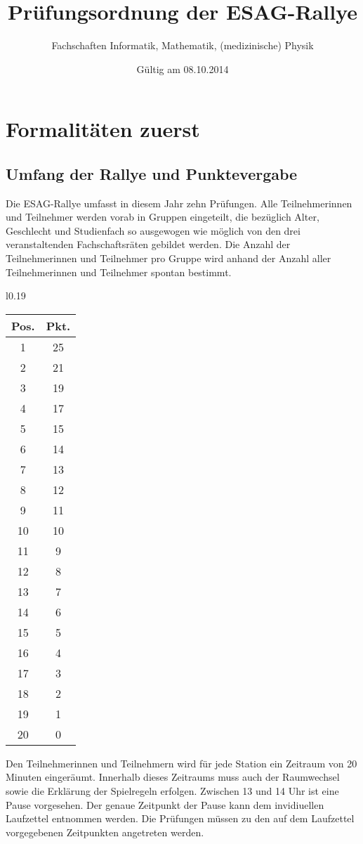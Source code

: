 \documentclass[a4paper,10pt]{article}
\title{Prüfungsordnung der ESAG-Rallye}
\author{Fachschaften Informatik, Mathematik, (medizinische) Physik}
\date{Gültig am 08.10.2014}
\begin{document}
\pagestyle{plain}
\maketitle
\tableofcontents

\newpage
\pagestyle{plain}
\section[Formalitäten]{Formalitäten zuerst}

\subsection{Umfang der Rallye und Punktevergabe}

Die ESAG-Rallye umfasst in diesem Jahr zehn Prüfungen. Alle Teilnehmerinnen 
und Teilnehmer werden vorab in Gruppen eingeteilt, die bezüglich Alter, Geschlecht und
Studienfach so ausgewogen wie möglich von den drei veranstaltenden
Fachschaftsräten gebildet werden. Die Anzahl der Teilnehmerinnen und Teilnehmer pro Gruppe
wird anhand der Anzahl aller Teilnehmerinnen und Teilnehmer spontan bestimmt.

\begin{wrapfigure}{l}{0.19\textwidth}
\begin{tabular}{c|c}
\textbf{Pos.} & \textbf{Pkt.} \\
\hline
1 & 25\\
2 & 21 \\
3 & 19 \\
4 & 17 \\
5 & 15 \\
6 & 14 \\
7 & 13 \\
8 & 12 \\
9 & 11 \\
10 &10 \\
11 & 9 \\
12 & 8 \\
13 & 7 \\
14 & 6 \\
15 & 5\\
16 & 4\\
17 & 3\\
18 & 2\\
19 & 1\\
20 & 0
\end{tabular}
\vspace{15pt}
\end{wrapfigure}

Den Teilnehmerinnen und Teilnehmern wird für jede Station ein Zeitraum 
von 20 Minuten eingeräumt. Innerhalb dieses Zeitraums muss auch der 
Raumwechsel sowie die Erklärung der Spielregeln erfolgen. Zwischen 
13 und 14 Uhr ist eine Pause vorgesehen. Der genaue Zeitpunkt der Pause 
kann dem invidiuellen Laufzettel entnommen werden. Die Prüfungen müssen 
zu den auf dem Laufzettel vorgegebenen Zeitpunkten angetreten werden.
\end{document}
